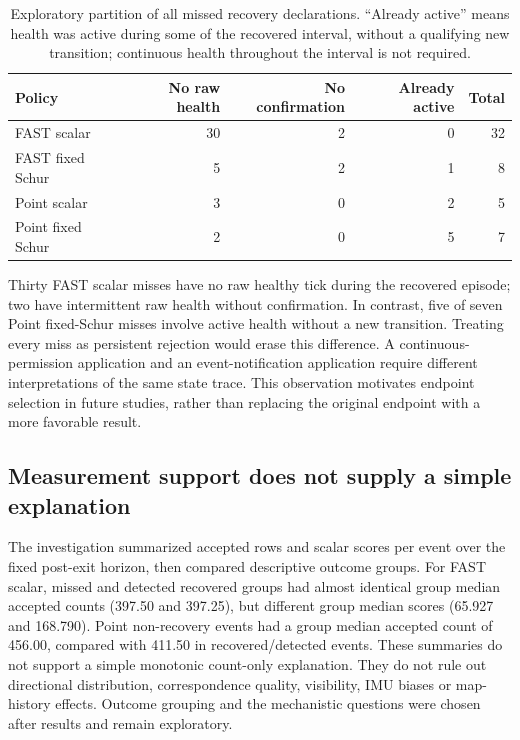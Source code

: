 \documentclass[11pt,a4paper]{article}
\begin{document}
\begin{table}[htbp]
\centering\small
\begin{tabular}{@{}lrrrr@{}}
\toprule Policy & No raw health & No confirmation & Already active & Total\\\midrule
FAST scalar & 30 & 2 & 0 & 32\\
FAST fixed Schur & 5 & 2 & 1 & 8\\
Point scalar & 3 & 0 & 2 & 5\\
Point fixed Schur & 2 & 0 & 5 & 7\\\bottomrule
\end{tabular}
\caption{Exploratory partition of all missed recovery declarations.
``Already active'' means health was active during some of the recovered
interval, without a qualifying new transition; continuous health throughout
the interval is not required.}\label{tab:misses}
\end{table}

Thirty FAST scalar misses have no raw healthy tick during the recovered
episode; two have intermittent raw health without confirmation. In contrast,
five of seven Point fixed-Schur misses involve active health without a new
transition. Treating every miss as persistent rejection would erase this
difference. A continuous-permission application and an event-notification
application require different interpretations of the same state trace.
This observation motivates endpoint selection in future studies, rather
than replacing the original endpoint with a more favorable result.

\subsection{Measurement support does not supply a simple explanation}
The investigation summarized accepted rows and scalar scores per event over
the fixed post-exit horizon, then compared descriptive outcome groups.
For FAST scalar, missed and detected recovered groups had almost identical
group median accepted counts (397.50 and 397.25), but different group median
scores (65.927 and 168.790). Point non-recovery events had a group median
accepted count of 456.00, compared with 411.50 in recovered/detected events.
These summaries do not support a simple monotonic count-only explanation.
They do not rule out directional distribution, correspondence quality,
visibility, IMU biases or map-history effects. Outcome grouping and the
mechanistic questions were chosen after results and remain exploratory.
\end{document}
